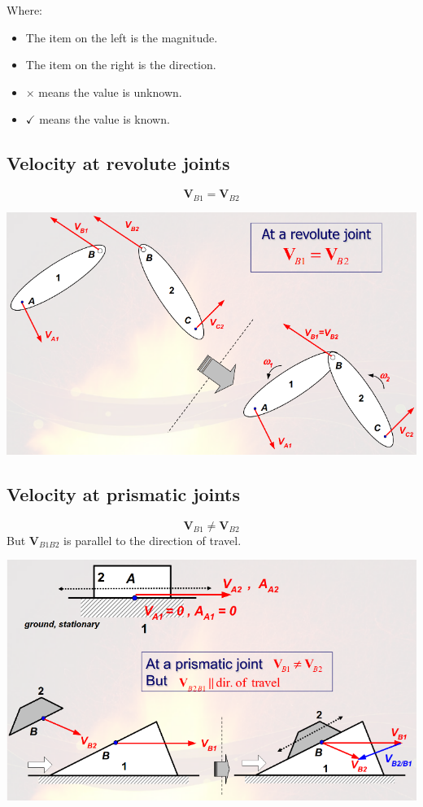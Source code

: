 \documentclass[11pt]{article}
\begin{document}
Where:
\begin{itemize}
\item The item on the left is the magnitude.
\item The item on the right is the direction.
\item \(\times\) means the value is unknown.
\item \(\checkmark\) means the value is known.
\end{itemize}
\subsection{Velocity at revolute joints}
\label{sec:org4fe0ecc}
\[\boldsymbol{V}_{B1} = \boldsymbol{V}_{B2}\]

\begin{center}
\includegraphics[width=.9\linewidth]{./images/velocity-at-revolute-joints.png}
\end{center}
\subsection{Velocity at prismatic joints}
\label{sec:org7f6d4ca}
\[\boldsymbol{V}_{B1} \ne \boldsymbol{V}_{B2}\]
But \(\boldsymbol{V}_{B1B2}\) is parallel to the direction of travel.

\begin{center}
\includegraphics[width=.9\linewidth]{./images/velocity-at-prismatic-joints.png}
\end{center}
\end{document}
